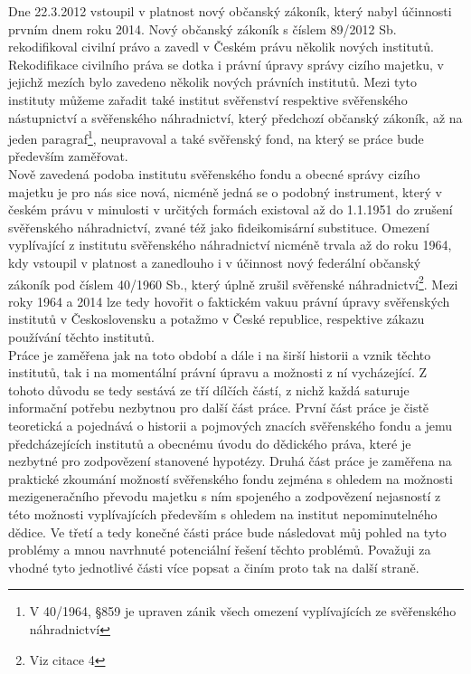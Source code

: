 \documentclass{article}
\begin{document}
\indent Dne 22.3.2012 vstoupil v platnost nový občanský zákoník, který nabyl účinnosti prvním dnem roku 2014. Nový občanský zákoník s číslem 89/2012 Sb. rekodifikoval civilní právo a zavedl v Českém právu několik nových institutů. Rekodifikace civilního práva se dotka i právní úpravy správy cizího majetku, v jejichž mezích bylo zavedeno několik nových právních institutů. Mezi tyto instituty můžeme zařadit také institut svěřenství respektive svěřenského nástupnictví a svěřenského náhradnictví, který předchozí občanský zákoník, až na jeden paragraf\footnote{V 40/1964, §859 je upraven zánik všech omezení vyplívajících ze svěřenského náhradnictví}, neupravoval a také svěřenský fond, na který se práce bude především zaměřovat. \\

\indent Nově zavedená podoba institutu svěřenského fondu a obecné správy cizího majetku je pro nás sice nová, nicméně jedná se o podobný instrument, který v českém právu v minulosti v určitých formách existoval až do 1.1.1951 do zrušení svěřens\-kého náhradnictví, zvané též jako fideikomisární substituce. Omezení vyplívající z institutu svěřenského náhradnictví nicméně trvala až do roku 1964, kdy vstoupil v platnost a zanedlouho i v účinnost nový federální občanský zákoník pod číslem 40/1960 Sb., který úplně zrušil svěřenské náhradnictví\footnote{Viz citace 4}. Mezi roky 1964 a 2014 lze tedy hovořit o faktickém vakuu právní úpravy svěřenských institutů v Československu a potažmo v České republice, respektive zákazu používání těchto institutů.\\

\indent Práce je zaměřena jak na toto období a dále i na širší historii a vznik těchto institutů, tak i na momentální právní úpravu a možnosti z ní vycházející. Z tohoto důvodu se tedy sestává ze tří dílčích částí, z nichž každá saturuje informační potřebu nezbytnou pro další část práce. První část práce je čistě teoretická a pojednává o historii a pojmových znacích svěřenského fondu a jemu předcházejících institutů a obecnému úvodu do dědického práva, které je nezbytné pro zodpovězení stanovené hypotézy. Druhá část práce je zaměřena na praktické zkoumání možností svěřenského fondu zejména s ohledem na možnosti mezigeneračního převodu majetku s ním spojeného a zodpovězení nejasností z této možnosti vyplívajících především s ohledem na institut nepominutelného dědice. Ve třetí a tedy konečné části práce bude následovat můj pohled na tyto problémy a mnou navrhnuté potenciální řešení těchto problémů. Považuji za vhodné tyto jednotlivé části více popsat a činím proto tak na další straně.\\
\end{document}
